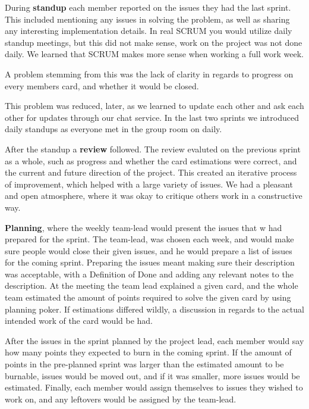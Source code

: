 During \textbf{standup} each member reported on the issues they had the last sprint.
This included mentioning any issues in solving the problem, as well as sharing any interesting implementation details.
In real SCRUM you would utilize daily standup meetings, but this did not make sense, work on the project was not done daily.
We learned that SCRUM makes more sense when working a full work week.

A problem stemming from this was the lack of clarity in regards to progress on every members card, and whether it would be closed.

This problem was reduced, later, as we learned to update each other and ask each other for updates through our chat service.
In the last two sprints we introduced daily standups as everyone met in the group room on daily.


After the standup a \textbf{review} followed.
The review evaluted on the previous sprint as a whole, such as progress and whether the card estimations were correct, and the current and future direction of the project.
This created an iterative process of improvement, which helped with a large variety of issues.
We had a pleasant and open atmosphere, where it was okay to critique others work in a constructive way.


\textbf{Planning}, where the weekly team-lead would present the issues that w had prepared for the sprint. 
The team-lead, was chosen each week, and would make sure people would close their given issues, and he would prepare a list of issues for the coming sprint.
Preparing the issues meant making sure their description was acceptable, with a Definition of Done and adding any relevant notes to the description.
At the meeting the team lead explained a given card, and the whole team estimated the amount of points required to solve the given card by using planning poker.
If estimations differed wildly, a discussion in regards to the actual intended work of the card would be had. 

After the issues in the sprint planned by the project lead, each member would say how many points they expected to burn in the coming sprint.
If the amount of points in the pre-planned sprint was larger than the estimated amount to be burnable, issues would be moved out, and if it was smaller, more issues would be estimated.
Finally, each member would assign themselves to issues they wished to work on, and any leftovers would be assigned by the team-lead.

